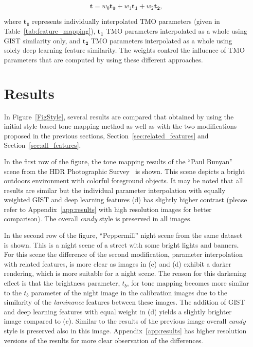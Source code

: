 \begin{equation}
   \mathbf{t} = w_0\mathbf{t_0} + w_1\mathbf{t_1} + w_2\mathbf{t_2}, 
\end{equation}

where $\mathbf{t_0}$ represents individually interpolated TMO parameters (given in Table~\ref{tab:feature_mapping}), $\mathbf{t_1}$ TMO parameters interpolated as a whole using GIST similarity only, and $\mathbf{t_2}$ TMO parameters interpolated as a whole using solely deep learning feature similarity. The weights control the influence of TMO parameters that are computed by using these different approaches.

\section{Results}
In Figure~\ref{FigStyle}, several results are compared that obtained by using the initial style based tone mapping method as well as with the two modifications proposed in the previous sections, Section~\ref{sec:related_features} and Section~\ref{sec:all_features}. 

In the first row of the figure, the tone mapping results of the ``Paul Bunyan'' scene from the HDR Photographic Survey~\cite{fairchild2007hdr} is shown. This scene depicts a bright outdoors environment with colorful foreground objects. It may be noted that all results are similar but the individual parameter interpolation with equally weighted GIST and deep learning features (d) has slightly higher contrast (please refer to Appendix~\ref{app:results} with high resolution images for better comparison). The overall \emph{candy} style is preserved in all images. 

In the second row of the figure, ``Peppermill'' night scene from the same dataset is shown. This is a night scene of a street with some bright lights and banners. For this scene the difference of the second modification, parameter interpolation with related features, is more clear as images in (c) and (d) exhibit a darker rendering, which is more suitable for a night scene. The reason for this darkening effect is that the brightness parameter, $t_b$, for tone mapping becomes more similar to the $t_b$ parameter of the night image in the calibration images due to the similarity of the \emph{luminance} features between these images. The addition of GIST and deep learning features with equal weight in (d) yields a slightly brighter image compared to (c). Similar to the results of the previous image overall \emph{candy} style is preserved also in this image. Appendix~\ref{app:results} has higher resolution versions of the results for more clear observation of the differences.


